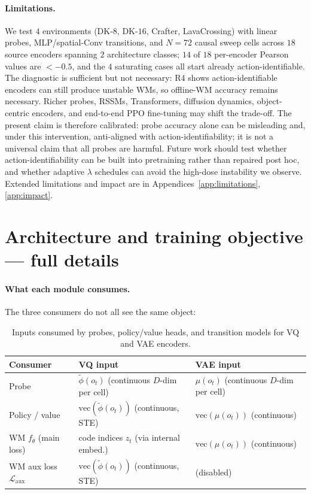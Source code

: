 \documentclass{article}
\begin{document}
\paragraph{Limitations.} We test $4$ environments (DK-$8$, DK-$16$, Crafter, LavaCrossing) with linear probes, MLP/spatial-Conv transitions, and $N{=}72$ causal sweep cells across $18$ source encoders spanning $2$ architecture classes; $14$ of $18$ per-encoder Pearson values are $< -0.5$, and the $4$ saturating cases all start already action-identifiable. The diagnostic is sufficient but not necessary: R4 shows action-identifiable encoders can still produce unstable WMs, so offline-WM accuracy remains necessary. Richer probes, RSSMs, Transformers, diffusion dynamics, object-centric encoders, and end-to-end PPO fine-tuning may shift the trade-off. The present claim is therefore calibrated: probe accuracy alone can be misleading and, under this intervention, anti-aligned with action-identifiability; it is not a universal claim that all probes are harmful. Future work should test whether action-identifiability can be built into pretraining rather than repaired post hoc, and whether adaptive $\lambda$ schedules can avoid the high-dose instability we observe. Extended limitations and impact are in Appendices~\ref{app:limitations}, \ref{app:impact}.




\newpage
\appendix

\section{Architecture and training objective --- full details}\label{app:arch-detail}

\paragraph{What each module consumes.}
The three consumers do not all see the same object:
\begin{table}[h]
  \centering
  \caption{Inputs consumed by probes, policy/value heads, and transition models for VQ and VAE encoders.}
  \label{tab:module-consumers}
  \begin{tabular}{l l l}
    \toprule
    Consumer & VQ input & VAE input \\
    \midrule
    Probe & $\tilde\phi(o_t)$ (continuous $D$-dim per cell) & $\mu(o_t)$ (continuous $D$-dim per cell) \\
    Policy / value & $\mathrm{vec}(\tilde\phi(o_t))$ (continuous, STE) & $\mathrm{vec}(\mu(o_t))$ (continuous) \\
    WM $f_\theta$ (main loss) & code indices $z_t$ (via internal embed.) & $\mathrm{vec}(\mu(o_t))$ (continuous) \\
    WM aux loss $\mathcal{L}_{\text{aux}}$ & $\mathrm{vec}(\tilde\phi(o_t))$ (continuous, STE) & (disabled) \\
    \bottomrule
  \end{tabular}
\end{table}
\end{document}
